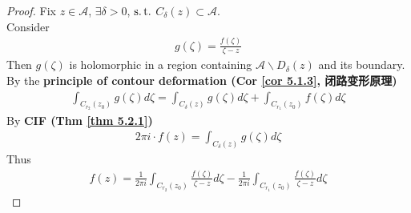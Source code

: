 \begin{thm}
		\vspace{1em}
		\begin{proof}
			Fix $z \in \mathcal{A}$, $\exists \delta > 0$, $\operatorname{s.t.}$ $C_{\delta}(z) \subset \mathcal{A}$. \\
			Consider 
			\begin{align}
				g(\zeta) = \frac{f(\zeta)}{\zeta - z}
			\end{align}
			Then $g(\zeta)$ is holomorphic in a region containing $\mathcal{A} \backslash D_{\delta}(z)$ and its boundary. \\
			By the \textbf{principle of contour deformation (Cor \ref{cor 5.1.3}, 闭路变形原理)}
			\begin{align}
				\int_{C_{r_2}(z_0)}{g(\zeta) d\zeta} = \int_{C_{\delta}(z)}{g(\zeta) d\zeta} + \int_{C_{r_1}(z_0)}{f(\zeta) d\zeta}
			\end{align}
			By \textbf{CIF (Thm \ref{thm 5.2.1})}
			\begin{align}
				2 \pi i \cdot f(z) = \int_{C_{\delta}(z)}{g(\zeta) d\zeta}
			\end{align}
			Thus
			\begin{align}
				f(z) = \frac{1}{2 \pi i} \int_{C_{r_2}(z_0)}{\frac{f(\zeta)}{\zeta - z} d\zeta} - \frac{1}{2 \pi i} \int_{C_{r_1}(z_0)}{\frac{f(\zeta)}{\zeta - z} d\zeta}
			\end{align}
		\end{proof}
	\end{thm}











	\ifx\allfiles\undefined

\fi